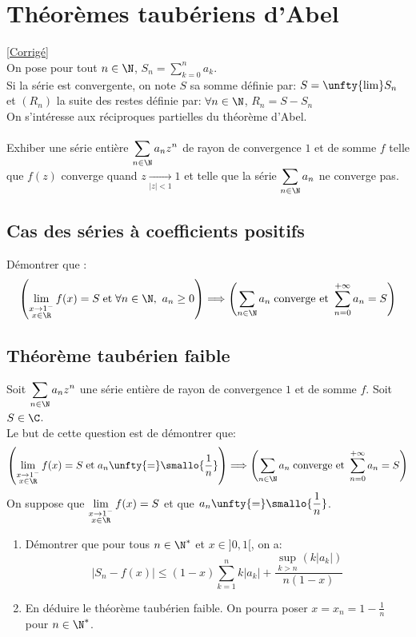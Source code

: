 \documentclass{book}
\begin{document}
\section{Théorèmes taubériens d'Abel}
\textcolor{blue}{\hyperref[sec:theoremes-tauberiens-dabel]{[Corrigé]}}\\
\label{Théorème taubériens d'Abel}
On pose pour tout $n\in\N$, $S_n=\displaystyle\sum_{k=0}^n a_k$. 
\\Si la série est convergente, on note $S$ sa somme définie par: $S=\unfty{\lim}S_n$ \\et $(R_n)$ la suite des restes définie par: $\forall n\in\N$, $R_n=S-S_n$
\\On s'intéresse aux réciproques partielles du théorème d'Abel.
\\
\\Exhiber une série entière $\displaystyle\sum_{n\in \N} a_nz^n$ de rayon de convergence $1$ et de somme $f$ telle que $f(z)$ converge quand $z\underset{|z|<1}{\longrightarrow}1$ et telle que la série $\displaystyle\sum_{n\in \N} a_n$ ne converge pas.

\subsection{Cas des séries à coefficients positifs}
Démontrer que :
$$\left(\lim_{\substack{x\to1^-\\x\in \R}}f(x)=S \; \text{et} \; \forall n\in \N,\ a_n\geq 0\right)\Longrightarrow\left(\sum_{n\in \N} a_n \; \text{converge et } \sum_{n=0}^{+\infty}a_n=S\right)$$

\subsection{Théorème taubérien faible}
Soit $\displaystyle\sum_{n\in \N} a_nz^n$ une série entière de rayon de convergence $1$ et de somme $f$. Soit $S\in\C$. 
\\Le but de cette question est de démontrer que: $$\left(\lim_{\substack{x\to1^-\\x\in \R}}f(x)=S \; \text{et} \; a_n\unfty{=}\smallo{\frac{1}{n}}\right)\Longrightarrow\left(\sum_{n\in \N} a_n \; \text{converge et } \sum_{n=0}^{+ \infty}a_n=S\right)$$
On suppose que $\lim\limits_{\substack{x\to1^-\\x\in \R}}f(x)=S$ et que $a_n\unfty{=}\displaystyle\smallo{\frac{1}{n}}$.
\begin{enumerate}
	\item Démontrer que pour tous $n\in\N^*$ et $x\in]0,1[$, on a:
	$$|S_n-f(x)|\leq(1-x)\sum_{k=1}^nk|a_k|+\frac{\sup\limits_{k>n}(k|a_k|)}{n(1-x)}$$
	\item En déduire le théorème taubérien faible. On pourra poser $x=x_n=1-\displaystyle\frac{1}{n}$ pour $n\in\N^*$.
\end{enumerate}
\end{document}
